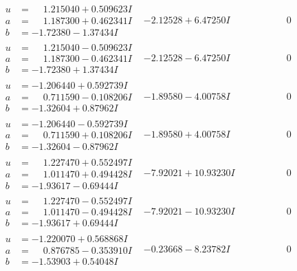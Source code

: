 \documentclass[1p]{elsarticle_modified}
\theoremstyle{definition}
\begin{document}
$$\begin{array}{c|c|c}
\begin{aligned}
u &= \phantom{-}1.215040 + 0.509623 I \\
a &= \phantom{-}1.187300 + 0.462341 I \\
b &= -1.72380 - 1.37434 I\end{aligned}
 & -2.12528 + 6.47250 I & \phantom{-0.000000 } 0 \\ \hline\begin{aligned}
u &= \phantom{-}1.215040 - 0.509623 I \\
a &= \phantom{-}1.187300 - 0.462341 I \\
b &= -1.72380 + 1.37434 I\end{aligned}
 & -2.12528 - 6.47250 I & \phantom{-0.000000 } 0 \\ \hline\begin{aligned}
u &= -1.206440 + 0.592739 I \\
a &= \phantom{-}0.711590 - 0.108206 I \\
b &= -1.32604 + 0.87962 I\end{aligned}
 & -1.89580 - 4.00758 I & \phantom{-0.000000 } 0 \\ \hline\begin{aligned}
u &= -1.206440 - 0.592739 I \\
a &= \phantom{-}0.711590 + 0.108206 I \\
b &= -1.32604 - 0.87962 I\end{aligned}
 & -1.89580 + 4.00758 I & \phantom{-0.000000 } 0 \\ \hline\begin{aligned}
u &= \phantom{-}1.227470 + 0.552497 I \\
a &= \phantom{-}1.011470 + 0.494428 I \\
b &= -1.93617 - 0.69444 I\end{aligned}
 & -7.92021 + 10.93230 I & \phantom{-0.000000 } 0 \\ \hline\begin{aligned}
u &= \phantom{-}1.227470 - 0.552497 I \\
a &= \phantom{-}1.011470 - 0.494428 I \\
b &= -1.93617 + 0.69444 I\end{aligned}
 & -7.92021 - 10.93230 I & \phantom{-0.000000 } 0 \\ \hline\begin{aligned}
u &= -1.220070 + 0.568868 I \\
a &= \phantom{-}0.876785 - 0.353910 I \\
b &= -1.53903 + 0.54048 I\end{aligned}
 & -0.23668 - 8.23782 I & \phantom{-0.000000 } 0 \\ \hline\begin{aligned}

\end{aligned}
\end{array}$$
\end{document}
